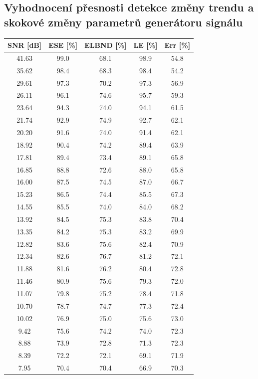 \documentclass[11pt,twoside,openright]{report}
\begin{document}
\begin{appendices}
\section{Vyhodnocení přesnosti detekce změny trendu a skokové změny parametrů generátoru signálu}\label{priloha:tab}
\begin{table}[!h]
\begin{center}
\begin{tabular}{|c|c|c|c|c|}
\hline
\textbf{SNR [dB]} & \textbf{ESE [\%]} & \textbf{ELBND [\%]} & \textbf{LE [\%]} & \textbf{Err [\%]} \\ 
\hline
41.63 & 99.0 & 68.1 & 98.9 & 54.8 \\ 
35.62 & 98.4 & 68.3 & 98.4 & 54.2 \\ 
29.61 & 97.3 & 70.2 & 97.3 & 56.9 \\ 
26.11 & 96.1 & 74.6 & 95.7 & 59.3 \\ 
23.64 & 94.3 & 74.0 & 94.1 & 61.5 \\ 
21.74 & 92.9 & 74.9 & 92.7 & 62.1 \\ 
20.20 & 91.6 & 74.0 & 91.4 & 62.1 \\ 
18.92 & 90.4 & 74.2 & 89.4 & 63.9 \\ 
17.81 & 89.4 & 73.4 & 89.1 & 65.8 \\ 
16.85 & 88.8 & 72.6 & 88.0 & 65.8 \\ 
16.00 & 87.5 & 74.5 & 87.0 & 66.7 \\ 
15.23 & 86.5 & 74.4 & 85.5 & 67.3 \\ 
14.55 & 85.5 & 74.0 & 84.0 & 68.2 \\ 
13.92 & 84.5 & 75.3 & 83.8 & 70.4 \\ 
13.35 & 84.2 & 75.3 & 83.2 & 69.9 \\ 
12.82 & 83.6 & 75.6 & 82.4 & 70.9 \\ 
12.34 & 82.6 & 76.7 & 81.2 & 72.1 \\ 
11.88 & 81.6 & 76.2 & 80.4 & 72.8 \\ 
11.46 & 80.9 & 75.6 & 79.3 & 72.0 \\ 
11.07 & 79.8 & 75.2 & 78.4 & 71.8 \\ 
10.70 & 78.7 & 74.7 & 77.3 & 72.4 \\ 
10.02 & 76.9 & 75.0 & 75.6 & 73.0 \\ 
9.42 & 75.6 & 74.2 & 74.0 & 72.3 \\ 
8.88 & 73.9 & 72.8 & 71.3 & 72.3 \\ 
8.39 & 72.2 & 72.1 & 69.1 & 71.9 \\ 
7.95 & 70.4 & 70.4 & 66.9 & 70.3 \\ 

\end{tabular}
\end{center}
\end{table}
\end{appendices}
\end{document}
